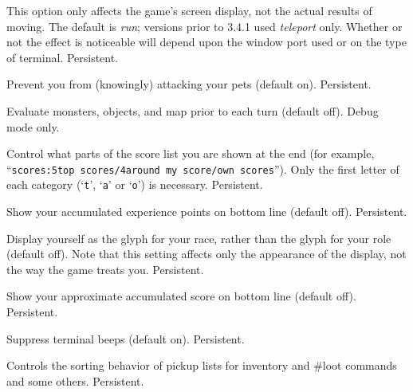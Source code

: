 This option only affects the game's screen display, not the actual
results of moving.  The default is {\it run\/}; versions prior to 3.4.1
used {\it teleport\/} only.  Whether or not the effect is noticeable will
depend upon the window port used or on the type of terminal.  Persistent.
\item[\ib{safe\verb+_+pet}]
Prevent you from (knowingly) attacking your pets (default on).  Persistent.
\item[\ib{sanity\verb+_+check}]
Evaluate monsters, objects, and map prior to each turn (default off).
Debug mode only.
\item[\ib{scores}]
Control what parts of the score list you are shown at the end (for example,
``{\tt scores:5top scores/4around my score/own scores}'').  Only the first
letter of each category (`{\tt t}', `{\tt a}' or `{\tt o}') is necessary.
Persistent.
\item[\ib{showexp}]
Show your accumulated experience points on bottom line (default off).
Persistent.
\item[\ib{showrace}]
Display yourself as the glyph for your race, rather than the glyph
for your role (default off).  Note that this setting affects only
the appearance of the display, not the way the game treats you.
Persistent.
\item[\ib{showscore}]
Show your approximate accumulated score on bottom line (default off).
Persistent.
\item[\ib{silent}]
Suppress terminal beeps (default on).  Persistent.
\item[\ib{sortloot}]
Controls the sorting behavior of pickup lists for inventory
and \#loot commands and some others.  Persistent.

